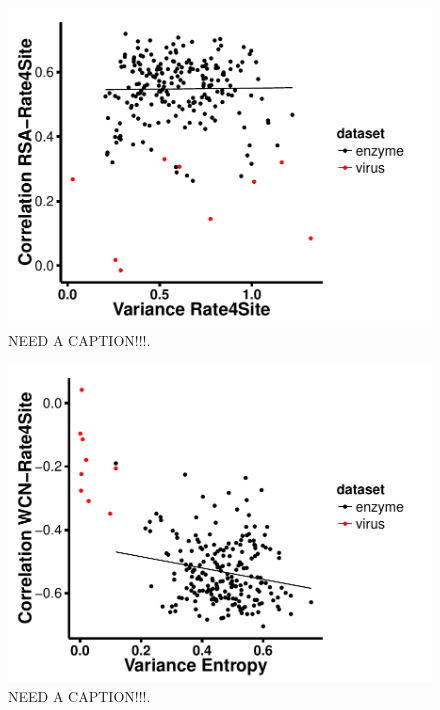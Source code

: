\documentclass[12pt]{article}
\begin{document}
    
            \begin{figure}[H]
            \centerline{\includegraphics[width=5.0in]{var_rate_rsa_cor.pdf}}     
            \caption{NEED A CAPTION!!!.}
            \label{fig:seqent_structure_cors}
    \end{figure}
    
        \begin{figure}[H]
            \centerline{\includegraphics[width=5.0in]{var_entropy_rate_cor.pdf}}     
            \caption{NEED A CAPTION!!!.}
            \label{fig:seqent_structure_cors}
    \end{figure}
    
\end{document}
